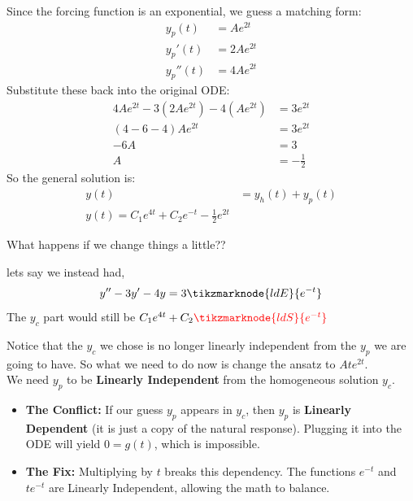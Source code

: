 \documentclass[11pt]{article}
\begin{document}
Since the forcing function is an exponential, we guess a matching form:
\begin{align*}
    y_p(t) &= Ae^{2t} \\
    y_p'(t) &= 2Ae^{2t} \\
    y_p''(t) &= 4Ae^{2t}
\end{align*}
Substitute these back into the original ODE:
\begin{align*}
    4Ae^{2t} - 3(2Ae^{2t}) - 4(Ae^{2t}) &= 3e^{2t} \\
    (4 - 6 - 4)Ae^{2t} &= 3e^{2t} \\
    -6A &= 3 \\
    A &= -\frac{1}{2}
\end{align*}
So the general solution is:
\begin{align*}
    y(t) &= y_h(t) + y_p(t) \\
    \boxed{y(t) = C_1e^{4t} + C_2e^{-t} - \frac{1}{2}e^{2t}}
\end{align*}

What happens if we change things a little??

lets say we instead had,
\begin{align*}
    y''-3y'-4y&=3\tikzmarknode{ldE}{e^{-t}}\\
\end{align*}
The $y_c$ part would still be $C_1e^{4t}+C_2\textcolor{red}{\tikzmarknode{ldS}{e^{-t}}}$

Notice that the $y_c$ we chose is no longer linearly independent from the $y_p$ we are going to have. So what we need to do now is change the ansatz to $Ate^{2t}$. \\
We need $y_p$ to be \textbf{Linearly Independent} from the homogeneous solution $y_c$.

\begin{itemize}
    \item \textbf{The Conflict:} If our guess $y_p$ appears in $y_c$, then $y_p$ is \textbf{Linearly Dependent} (it is just a copy of the natural response). Plugging it into the ODE will yield $0 = g(t)$, which is impossible.
    \item \textbf{The Fix:} Multiplying by $t$ breaks this dependency. The functions $e^{-t}$ and $te^{-t}$ are Linearly Independent, allowing the math to balance.
\end{itemize}
\end{document}
